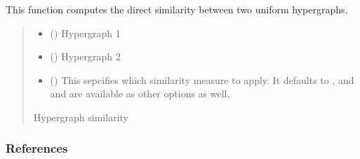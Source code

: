 \documentclass[letterpaper,10pt,english]{sphinxmanual}
\begin{document}
\begin{fulllineitems}
\label{\detokenize{HAT:HAT.HAT.directSimilarity}}
\pysigstartsignatures
{}
\pysigstopsignatures
\sphinxAtStartPar
This function computes the direct similarity between two uniform hypergraphs.
\begin{quote}\begin{description}
\begin{itemize}
\item {} 
\sphinxAtStartPar
{} () \textendash{} Hypergraph 1

\item {} 
\sphinxAtStartPar
{} () \textendash{} Hypergraph 2

\item {} 
\sphinxAtStartPar
{} (\sphinxstyleliteralemphasis{\sphinxupquote{, }}) \textendash{} This sepcifies which similarity measure to apply. It defaults to
, and  and  are available as other options
as well.

\end{itemize}

\sphinxAtStartPar
Hypergraph similarity

\sphinxAtStartPar
{}

\end{description}\end{quote}
\subsubsection*{References}

\end{fulllineitems}

\end{document}
